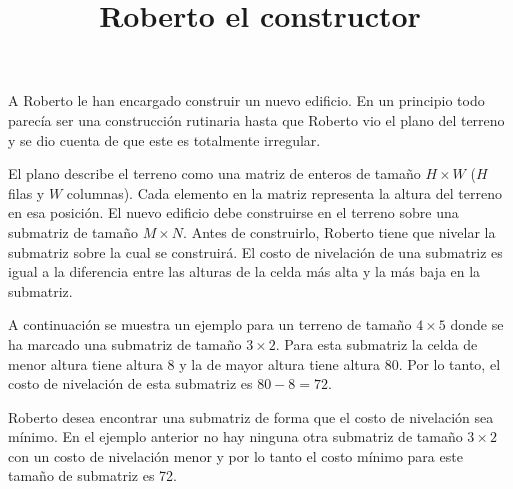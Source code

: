 \documentclass{oci}
\title{Roberto el constructor}
\begin{document}
\begin{problemDescription}
  A Roberto le han encargado construir un nuevo edificio.
  En un principio todo parecía ser una construcción rutinaria hasta que Roberto vio el plano
  del terreno y se dio cuenta de que este es totalmente irregular.

  El plano describe el terreno como una matriz de enteros de tamaño $H\times W$
  ($H$ filas y $W$ columnas).
  Cada elemento en la matriz representa la altura del terreno en esa posición.
  El nuevo edificio debe construirse en el terreno sobre una submatriz de tamaño $M\times N$.
  Antes de construirlo, Roberto tiene que nivelar la submatriz sobre la cual se construirá.
  El costo de nivelación de una submatriz es igual a la diferencia entre las alturas de la celda
  más alta y la más baja en la submatriz.

  A continuación se muestra un ejemplo para un terreno de tamaño $4\times 5$ donde se ha marcado
  una submatriz de tamaño $3\times 2$.
  Para esta submatriz la celda de menor altura tiene altura 8 y la de mayor altura tiene altura 80.
  Por lo tanto, el costo de nivelación de esta submatriz es $80 - 8=72$.

  \begin{center}
  \end{center}

  Roberto desea encontrar una submatriz de forma que el costo de nivelación sea mínimo.
  En el ejemplo anterior no hay ninguna otra submatriz de tamaño $3\times 2$ con un costo de
  nivelación menor y por lo tanto el costo mínimo para este tamaño de submatriz es 72.
\end{problemDescription}
\end{document}
